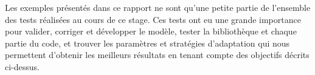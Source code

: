 \indent Les exemples présentés dans ce rapport ne sont qu'une petite partie de l'ensemble des tests réalisées au cours de ce stage. Ces tests ont eu une grande importance pour valider, corriger et développer le modèle, tester la bibliothèque et chaque partie du code, et trouver les paramètres et stratégies d'adaptation qui nous permettent d'obtenir les meilleurs résultats en tenant compte des objectifs décrits ci-dessus.